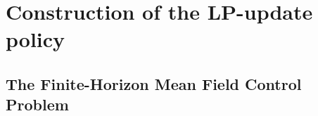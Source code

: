 \section{Construction of the LP-update policy}
\label{sec:algo}

\subsection{The Finite-Horizon Mean Field Control Problem}

 

